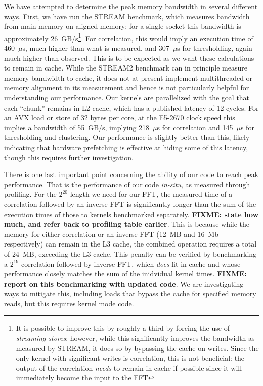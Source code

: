 \documentclass{article}
\begin{document}
We have attempted to determine the peak memory bandwidth in several different
ways. First, we have run the STREAM benchmark, which measures bandwidth from
main memory on aligned memory; for a single socket this bandwidth is
approximately 26~GB/s\footnote{It is possible to improve this by roughly a third
  by forcing the use of \emph{streaming stores}; however, while this
  significantly improves the bandwidth as measured by STREAM, it does so by
  bypassing the cache on writes.  Since the only kernel with significant writes
  is correlation, this is not beneficial: the output of the correlation
  \emph{needs} to remain in cache if possible since it will immediately become
  the input to the FFT}. For correlation, this would imply an execution time of
460~$\mu$s, much higher than what is measured, and 307~$\mu$s for thresholding,
again much higher than observed.  This is to be expected as we want these
calculations to remain in cache.  While the STREAM2 benchmark can in principle
measure memory bandwidth to cache, it does not at present implement multithreaded
or memory alignment in its measurement and hence is not particularly helpful for
understanding our performance. Our kernels are parallelized with the goal that
each ``chunk'' remains in L2 cache, which has a published latency of 12
cycles. For an AVX load or store of 32 bytes per core, at the E5-2670 clock
speed this implies a bandwidth of 55~GB/s, implying 218~$\mu$s for correlation
and 145~$\mu$s for thresholding and clustering.  Our performance is slightly
better than this, likely indicating that hardware prefetching is effective at
hiding some of this latency, though this requires further investigation.

There is one last important point concerning the ability of our code to reach
peak performance. That is the performance of our code \emph{in-situ}, as
measured through profiling.  For the $2^{20}$ length we need for our FFT, the
measured time of a correlation followed by an inverse FFT is significantly
longer than the sum of the execution times of those to kernels benchmarked
separately. \textbf{FIXME: state how much, and refer back to profiling table
  earlier}. This is because while the memory for either correlation or an
inverse FFT (12~MB and 16~Mb respectively) can remain in the L3 cache, the
combined operation requires a total of 24~MB, exceeding the L3 cache.  This
penalty can be verified by benchmarking a $2^{19}$ correlation followed by
inverse FFT, which \emph{does} fit in cache and whose performance closely
matches the sum of the inidvidual kernel times. \textbf{FIXME: report on this
  benchmarking with updated code}. We are investigating ways to mitigate this,
including loads that bypass the cache for specified memory reads, but this
requires kernel mode code.
\end{document}
